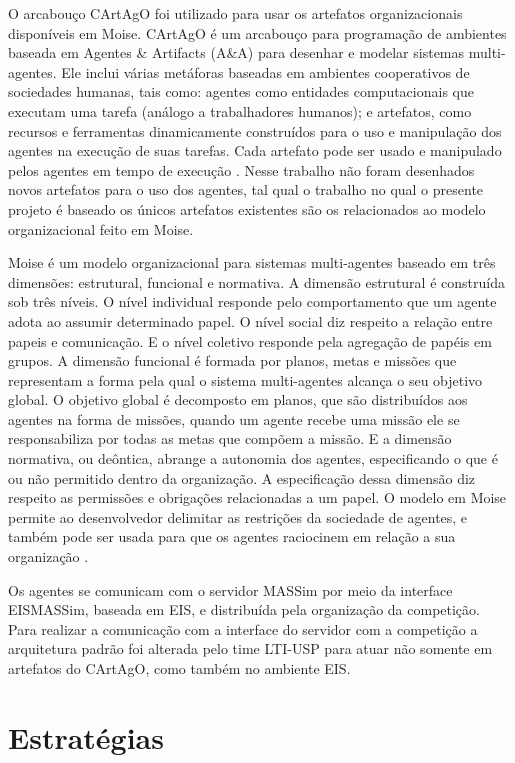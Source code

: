 \documentclass{llncs}
\begin{document}
O arcabouço CArtAgO foi utilizado para usar os artefatos organizacionais disponíveis em Moise. CArtAgO é um arcabouço para programação de ambientes baseada em Agentes \& Artifacts (A\&A) para desenhar e modelar sistemas multi-agentes. Ele inclui várias metáforas baseadas em ambientes cooperativos de sociedades humanas, tais como: agentes como entidades computacionais que executam uma tarefa (análogo a trabalhadores humanos); e artefatos, como recursos e ferramentas dinamicamente construídos para o uso e manipulação dos agentes na execução de suas tarefas. Cada artefato pode ser usado e manipulado pelos agentes em tempo de execução \cite{ricci2011cartago}. Nesse trabalho não foram desenhados novos artefatos para o uso dos agentes, tal qual o trabalho no qual o presente projeto é baseado os únicos artefatos existentes são os relacionados ao modelo organizacional feito em Moise.

Moise é um modelo organizacional para sistemas multi-agentes baseado em três dimensões: estrutural, funcional e normativa. A dimensão estrutural é construída sob três níveis. O nível individual responde pelo comportamento que um agente adota ao assumir determinado papel. O nível social diz respeito a relação entre papeis e comunicação. E o nível coletivo responde pela agregação de papéis em grupos. A dimensão funcional é formada por planos, metas e missões que representam a forma pela qual o sistema multi-agentes alcança o seu objetivo global. O objetivo global é decomposto em planos, que são distribuídos aos agentes na forma de missões, quando um agente recebe uma missão ele se responsabiliza por todas as metas que compõem a missão. E a dimensão normativa, ou deôntica, abrange a autonomia dos agentes, especificando o que é ou não permitido dentro da organização. A especificação dessa dimensão diz respeito as permissões e obrigações relacionadas a um papel. O modelo em Moise permite ao desenvolvedor delimitar as restrições da sociedade de agentes, e também pode ser usada para que os agentes raciocinem em relação a sua organização \cite{hubner2010moise}.

Os agentes se comunicam com o servidor MASSim por meio da interface EISMASSim, baseada em EIS, e distribuída pela organização da competição. Para realizar a comunicação com a interface do servidor com a competição a arquitetura padrão foi alterada pelo time LTI-USP para atuar não somente em artefatos do CArtAgO, como também no ambiente EIS.

\section{Estratégias}\label{sec:strategies}
\end{document}
